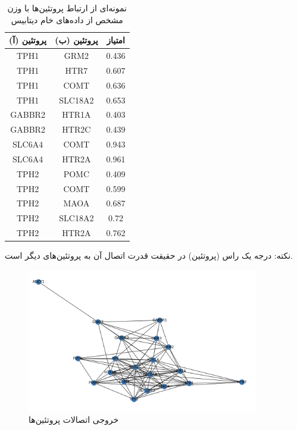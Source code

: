 \documentclass[10pt, a4paper]{article}
\begin{document}
\begin{LTR}
    \begin{table}[H]
        \centering
        \begin{RTL}
            \caption{نمونه‌ای از ارتباط پروتئین‌ها با وزن مشخص از داده‌های خام
            دیتابیس }
        \end{RTL}
        \begin{tabular}{cc|c}
            پروتئین (آ) & پروتئین (ب) & امتیاز \\ \hline
            TPH1 & GRM2 & 0.436 \\ \hline  
            TPH1 & HTR7 & 0.607 \\ \hline
            TPH1 & COMT & 0.636 \\ \hline
            TPH1 & SLC18A2 & 0.653 \\ \hline
            GABBR2 & HTR1A & 0.403 \\ \hline
            GABBR2 & HTR2C & 0.439 \\ \hline
            SLC6A4 & COMT & 0.943 \\ \hline
            SLC6A4 & HTR2A & 0.961 \\ \hline
            TPH2 & POMC & 0.409 \\ \hline
            TPH2 & COMT & 0.599 \\ \hline
            TPH2 & MAOA & 0.687 \\ \hline
            TPH2 & SLC18A2 & 0.72 \\ \hline
            TPH2 & HTR2A & 0.762 \\ 
        \end{tabular}
    \end{table}
\end{LTR}

نکته: درجه یک راس (پروتئین) در حقیقت قدرت اتصال آن به پروتئین‌های دیگر است.

\begin{figure}[H]
    \centering
    \includegraphics[width=0.9\textwidth]{images/exported_graph.png}
    \caption{خروجی اتصالات پروتئین‌ها}
    \label{fig: exportedGraph}
\end{figure}
\end{document}
